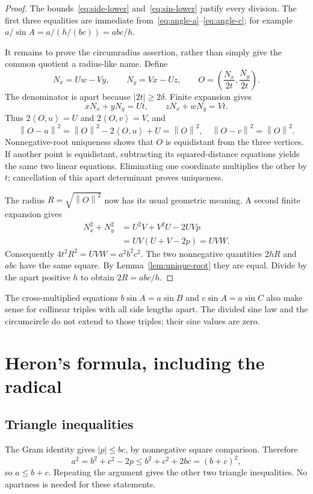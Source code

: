 \documentclass[11pt,a4paper]{article}
\theoremstyle{definition}
\newcommand{\abs}[1]{\left|#1\right|}
\newcommand{\norm}[1]{\left\lVert#1\right\rVert}
\newcommand{\ip}[2]{\left\langle#1,#2\right\rangle}
\numberwithin{equation}{section}
\begin{document}
\begin{proof}
The bounds~\eqref{eq:side-lower} and~\eqref{eq:sin-lower}
justify every division. The first three equalities are immediate
from~\eqref{eq:angle-a}--\eqref{eq:angle-c}; for example
\(a/\sin A=a/(h/(bc))=abc/h\).

It remains to prove the circumradius assertion, rather than simply
give the common quotient a radius-like name. Define
\[
 N_x=Uw-Vy,\qquad N_y=Vx-Uz,\qquad
 O=\left(\frac{N_x}{2t},\frac{N_y}{2t}\right).
 \tag{6.1}\label{eq:center}
\]
The denominator is apart because \(\abs{2t}\ge2\delta\).
Finite expansion gives
\[
 xN_x+yN_y=Ut,\qquad zN_x+wN_y=Vt.
\]
Thus \(2\ip Ou=U\) and \(2\ip Ov=V\), and
\[
 \norm{O-u}^2=\norm O^2-2\ip Ou+U=\norm O^2,
 \quad
 \norm{O-v}^2=\norm O^2.
\]
Nonnegative-root uniqueness shows that \(O\) is equidistant from
the three vertices. If another point is equidistant, subtracting
its squared-distance equations yields the same two linear equations.
Eliminating one coordinate multiplies the other by \(t\);
cancellation of this apart determinant proves uniqueness.

The radius \(R=\sqrt{\norm O^2}\) now has its usual geometric
meaning. A second finite expansion gives
\begin{align*}
 N_x^2+N_y^2
 &=U^2V+V^2U-2UVp\\
 &=UV(U+V-2p)=UVW.
\end{align*}
Consequently \(4t^2R^2=UVW=a^2b^2c^2\).
The two nonnegative quantities \(2hR\) and \(abc\) have the same
square. By Lemma~\ref{lem:unique-root} they are equal.
Divide by the apart positive \(h\) to obtain \(2R=abc/h\).
\end{proof}

The cross-multiplied equations
\(b\sin A=a\sin B\) and \(c\sin A=a\sin C\)
also make sense for collinear triples with all side lengths apart.
The divided sine law and the circumcircle do not extend to those
triples; their sine values are zero.

\section{Heron's formula, including the radical}

\subsection{Triangle inequalities}

The Gram identity gives \(\abs p\le bc\), by nonnegative square
comparison. Therefore
\[
 a^2=b^2+c^2-2p\le b^2+c^2+2bc=(b+c)^2,
\]
so \(a\le b+c\). Repeating the argument gives the other two
triangle inequalities. No apartness is needed for these statements.
\end{document}
